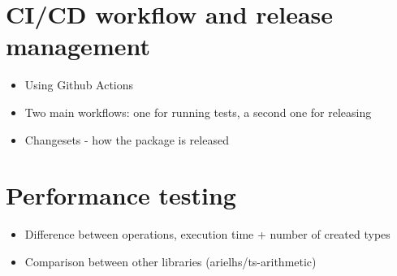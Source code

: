 \section{CI/CD workflow and release management}

\begin{itemize}
  \item Using Github Actions
  \item Two main workflows: one for running tests, a second one for releasing
  \item Changesets \cite{ChangesetsChangesets2023} - how the package is released
\end{itemize}

\section{Performance testing}

\begin{itemize}
  \item Difference between operations, execution time + number of created types 
  \item Comparison between other libraries (arielhs/ts-arithmetic)
\end{itemize}
